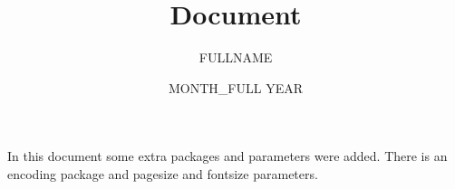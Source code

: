 \documentclass[12pt, a4, twoside]{article}
\title{Document}
\author{{{FULLNAME}}}
\date{{{MONTH_FULL}} {{YEAR}}}
\begin{document}
\begin{titlepage}
\maketitle
\end{titlepage}

In this document some extra packages and parameters
were added. There is an encoding package
and pagesize and fontsize parameters.
\end{document}
